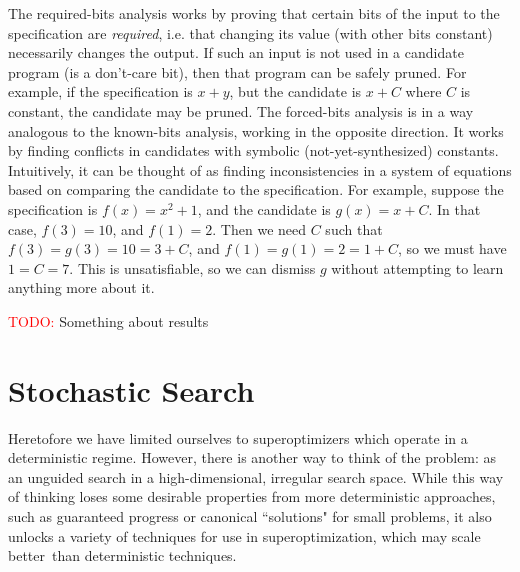 \documentclass[12pt,twoside]{reedthesis}
\newcommand{\red}[1]{\textcolor{red}{#1}}
\begin{document}
            The required-bits analysis works by proving that certain bits of the input to the specification are \textit{required}, i.e. that changing its value (with other bits constant) necessarily changes the output.
                If such an input is not used in a candidate program (is a don't-care bit), then that program can be safely pruned.
                    For example, if the specification is $x + y$, but the candidate is $x + C$ where $C$ is constant, the candidate may be pruned.
            The forced-bits analysis is in a way analogous to the known-bits analysis, working in the opposite direction.
                It works by finding conflicts in candidates with symbolic (not-yet-synthesized) constants.
                Intuitively, it can be thought of as finding inconsistencies in a system of equations based on comparing the candidate to the specification.
                For example, suppose the specification is $f(x) = x^2 + 1$, and the candidate is $g(x) = x + C$. In that case, $f(3) = 10$, and $f(1) = 2$. Then we need $C$ such that $f(3) = g(3) = 10 = 3 + C$, and $f(1) = g(1) = 2 = 1 + C$, so we must have $1 = C = 7$. This is unsatisfiable, so we can dismiss $g$ without attempting to learn anything more about it.
                
            \red{TODO:} Something about results
                

\chapter{Stochastic Search}
    Heretofore we have limited ourselves to superoptimizers which operate in a deterministic regime.
    However, there is another way to think of the problem: as an unguided search in a high-dimensional, irregular search space.
    While this way of thinking loses some desirable properties from more deterministic approaches, such as guaranteed progress or canonical ``solutions" for small problems, it also unlocks a variety of techniques for use in superoptimization, which may scale better\footnotemark\, than deterministic techniques.
    
        
\end{document}
